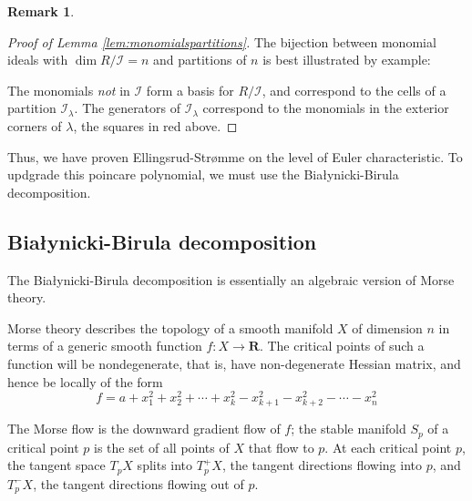 \documentclass{amsart}[12pt]
\theoremstyle{definition}
\newtheorem{remark}[dummy]{Remark}
\newcommand{\R}{\mathbf{R}}
\newcommand{\II}{\mathcal{I}}
\begin{document}
\begin{remark}
\begin{proof}[Proof of Lemma \ref{lem:monomialspartitions}]
The bijection between monomial ideals with $\dim R/\II=n$ and partitions of $n$ is best illustrated by example: 

\begin{center}
\end{center}

The monomials \emph{not} in $\II$ form a basis for $R/\II$, and correspond to the cells of a partition $\II_\lambda$.  The generators of $\II_\lambda$ correspond to the monomials in the exterior corners of $\lambda$, the squares in red above.

\end{proof}

Thus, we have proven Ellingsrud-Str\o mme on the level of Euler characteristic.  To updgrade this poincare polynomial, we must use the Bia\l ynicki-Birula decomposition.



\subsection{Bia\l ynicki-Birula decomposition}

The Bia\l ynicki-Birula decomposition is essentially an algebraic version of Morse theory.

Morse theory describes the topology of a smooth manifold $X$ of dimension $n$ in terms of a generic smooth function $f:X\to\R$.  The critical points of such a function will be nondegenerate, that is, have non-degenerate Hessian matrix, and hence be locally of the form
\[f=a+x_1^2+x_2^2+\cdots +x_k^2-x_{k+1}^2-x_{k+2}^2-\cdots -x_n^2\]

The Morse flow is the downward gradient flow of $f$; the stable manifold $S_p$ of a critical point $p$ is the set of all points of $X$ that flow to $p$.  At each critical point $p$, the tangent space $T_pX$ splits into $T^+_pX$, the tangent directions flowing into $p$, and $T_p^-X$, the tangent directions flowing out of $p$.



\end{remark}
\end{document}
